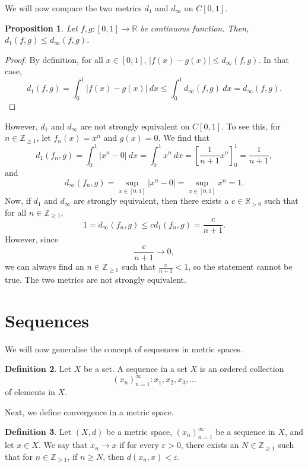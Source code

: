 \documentclass[a4paper, openany]{memoir}
\theoremstyle{definition}
\newtheorem{definition}{Definition}[section]
\theoremstyle{plain}
\newtheorem{proposition}[definition]{Proposition}
\begin{document}
We will now compare the two metrics $d_1$ and $d_\infty$ on $C[0, 1]$.
\begin{proposition}
Let $f, g: [0, 1] \to \mathbb{R}$ be continuous function. Then, $d_1(f, g) \leqslant d_\infty(f, g)$.
\end{proposition}
\begin{proof}
By definition, for all $x \in [0, 1]$, $|f(x) - g(x)| \leqslant d_\infty(f, g)$. In that case,
\[d_1(f, g) = \int_0^1 |f(x) - g(x)| \ dx \leqslant \int_0^1 d_\infty(f, g) \ dx = d_\infty(f, g).\]
\end{proof}
\noindent However, $d_1$ and $d_\infty$ are not strongly equivalent on $C[0, 1]$. To see this, for $n \in \mathbb{Z}_{\geqslant 1}$, let $f_n(x) = x^n$ and $g(x) = 0$. We find that
\[d_1(f_n, g) = \int_0^1 |x^n - 0| \ dx = \int_0^1 x^n \ dx = \left[\frac{1}{n+1} x^n\right]_0^1 = \frac{1}{n+1},\]
and
\[d_\infty(f_n, g) = \sup_{x \in [0, 1]} |x^n - 0| = \sup_{x \in [0, 1]} x^n = 1.\]
Now, if $d_1$ and $d_\infty$ are strongly equivalent, then there exists a $c \in \mathbb{R}_{> 0}$ such that for all $n \in \mathbb{Z}_{\geqslant 1}$,
\[1 = d_\infty(f_n, g) \leqslant c d_1(f_n, g) = \frac{c}{n+1}.\]
However, since
\[\frac{c}{n+1} \to 0,\]
we can always find an $n \in \mathbb{Z}_{\geqslant 1}$ such that $\frac{c}{n+1} < 1$, so the statement cannot be true. The two metrics are not strongly equivalent.
\newpage

\section{Sequences}
We will now generalise the concept of sequences in metric spaces. 
\begin{definition}
Let $X$ be a set. A sequence in a set $X$ is an ordered collection 
\[(x_n)_{n=1}^{\infty} : x_1, x_2, x_3, \dots\]
of elements in $X$.
\end{definition}
\noindent Next, we define convergence in a metric space.
\begin{definition}
Let $(X, d)$ be a metric space,  $(x_n)_{n=1}^{\infty}$ be a sequence in $X$, and let $x \in X$. We say that $x_n \to x$ if for every $\varepsilon > 0$, there exists an $N \in \mathbb{Z}_{\geqslant 1}$ such that for $n \in \mathbb{Z}_{\geqslant 1}$, if $n \geqslant N$, then $d(x_n, x) < \varepsilon$. 
\end{definition}
\end{document}
